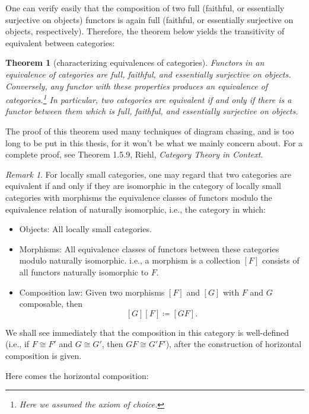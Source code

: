 \documentclass{article}
\newtheorem{theorem}{Theorem}[section]
\theoremstyle{definition}
\theoremstyle{definition}
\theoremstyle{remark}
\newtheorem*{remark}{Remark}
\begin{document}
	One can verify easily that the composition of two full (faithful, or essentially surjective on objects) functors is again full (faithful, or essentially surjective on objects, respectively). Therefore, the theorem below yields the transitivity of equivalent between categories:
	\begin{theorem}[characterizing equivalences of categories]
		Functors in an equivalence of categories are full, faithful, and essentially surjective on objects. Conversely, any functor with these properties produces an equivalence of categories.\footnote{Here we assumed the axiom of choice.} In particular, two categories are equivalent if and only if there is a functor between them which is full, faithful, and essentially surjective on objects.
	\end{theorem}
	The proof of this theorem used many techniques of diagram chasing, and is too long to be put in this thesis, for it won't be what we mainly concern about. For a complete proof, see Theorem 1.5.9, Riehl, \textsl{Category Theory in Context}.
	\begin{remark}
		For locally small categories, one may regard that two categories are equivalent if and only if they are isomorphic in the category of locally small categories with morphisms the equivalence classes of functors modulo the equivalence relation of naturally isomorphic, i.e., the category in which:
		\begin{itemize}
			\item Objects: All locally small categories.
			\item Morphisms: All equivalence classes of functors between these categories modulo naturally isomorphic. i.e., a morphism is a collection $[F]$ consists of all functors naturally isomorphic to $F$.
			\item Composition law: Given two morphisms $[F]$ and $[G]$ with $F$ and $G$ composable, then 
			\[[G][F]\coloneqq [GF].\]
		\end{itemize}
		We shall see immediately that the composition in this category is well-defined (i.e., if $F\cong F'$ and $G\cong G'$, then $GF\cong G'F'$), after the construction of horizontal composition is given.
	\end{remark}
	Here comes the horizontal composition:
\end{document}
